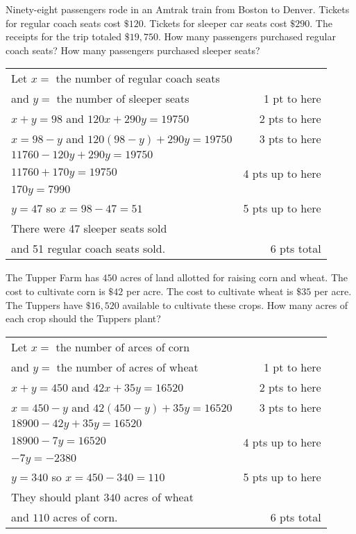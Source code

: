 {
	Ninety-eight passengers rode in an Amtrak train from Boston to Denver. Tickets for regular coach seats cost $\$120$. Tickets for sleeper car seats cost $\$290$. The receipts for the trip totaled $\$19,\!750$. How many passengers purchased regular coach seats? How many passengers purchased sleeper seats?
}
{
	\begin{tabular}{l r}
	Let $x =$ the number of regular coach seats\\ 
	and $y =$ the number of sleeper seats & 1 pt to here\\
	$x + y = 98$     and   $120x + 290y = 19750$ & 2 pts to here\\
	$x = 98 - y$ and    $120(98 - y) +290y =19750$ & 3 pts to here\\
	$11760 - 120y + 290y = 19750$\\
	$11760 + 170y  = 19750$ & 4 pts up to here\\
	$170y  = 7990$\\
	$y = 47$ so $x =98-47=51$ & 5 pts up to here \\
	There were 47 sleeper seats sold \\and 51 regular coach seats sold.  & 6 pts total\\
	\end{tabular}
}

{
	The Tupper Farm has $450$ acres of land allotted for raising corn and wheat. The cost to cultivate corn is $\$42$ per acre. The cost to cultivate wheat is $\$35$ per acre. The Tuppers have $\$16,\!520$ available to cultivate these crops. How many acres of each crop should the Tuppers plant?
}
{
	\begin{tabular}{l r}
	Let $x =$ the number of arces of corn\\ 
	and $y =$ the number of acres of wheat & 1 pt to here\\
	$x + y = 450$     and   $42x + 35y = 16520$ & 2 pts to here\\
	$x = 450 - y$ and    $42(450 - y) +35y =16520$ & 3 pts to here\\
	$18900 - 42y + 35y = 16520$\\
	$18900-7y  = 16520$ & 4 pts up to here\\
	$-7y  = -2380$\\
	$y = 340$ so $x =450-340=110$ & 5 pts up to here \\
	They should plant $340$ acres of wheat \\and $110$ acres of corn.  & 6 pts total\\
	\end{tabular}
}
